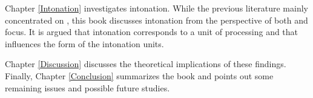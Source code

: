 \begin{refsection}
\newpage 
Chapter \ref{Intonation} investigates intonation.
While the previous literature mainly concentrated on ,
this book discusses intonation from the perspective of both  and focus. %
It is argued that intonation corresponds to a unit of processing and that  influences the form of the intonation units.

Chapter \ref{Discussion} discusses the theoretical implications of these findings.
Finally, Chapter \ref{Conclusion} summarizes the book and points out some remaining issues and possible future studies.

\end{refsection}
